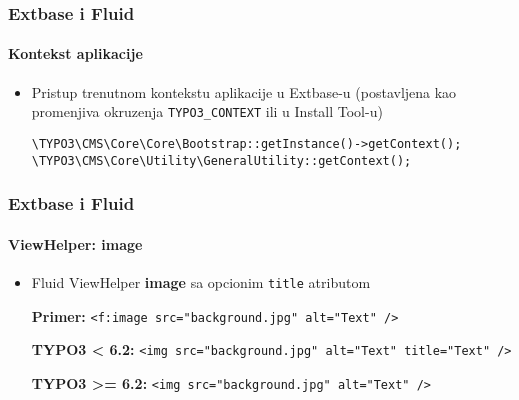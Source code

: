 
\begin{frame}[fragile]
	\frametitle{Extbase i Fluid}
	\framesubtitle{Kontekst aplikacije}

	\begin{itemize}
		\item Pristup trenutnom kontekstu aplikacije u Extbase-u\newline
			(postavljena kao promenjiva okruzenja \texttt{TYPO3\_CONTEXT} ili u Install Tool-u)\newline

			\lstinline!\TYPO3\CMS\Core\Core\Bootstrap::getInstance()->getContext();!
			\lstinline!\TYPO3\CMS\Core\Utility\GeneralUtility::getContext();!

	\end{itemize}

\end{frame}


\begin{frame}[fragile]
	\frametitle{Extbase i Fluid}
	\framesubtitle{ViewHelper: image}

	\begin{itemize}
		\item Fluid ViewHelper \textbf{image} sa opcionim \texttt{title} atributom\newline

			\smaller\textbf{Primer:}\normalsize\newline
			\lstinline!<f:image src="background.jpg" alt="Text" />!
			\newline

			\smaller\textbf{TYPO3 < 6.2:}\normalsize\newline
			\lstinline!<img src="background.jpg" alt="Text" title="Text" />!
			\newline

			\smaller\textbf{TYPO3 >= 6.2:}\normalsize\newline
			\lstinline!<img src="background.jpg" alt="Text" />!

	\end{itemize}

\end{frame}

